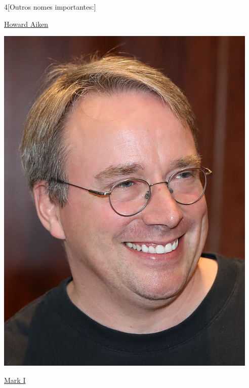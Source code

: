 \begin{multicols}{4}[Outros nomes importantes:]
\vfill\null
\columnbreak				
				
				\href{https://pt.wikipedia.org/wiki/Howard_Aiken}{Howard Aiken}
				
\begin{center}
					\includegraphics[width=.8\columnwidth]{./IMG-GIT/CIENTISTAS/linus.jpeg}
\end{center}
				
\vfill\null
\columnbreak				
				
				\href{https://pt.wikipedia.org/wiki/Mark_I}{Mark I}
				

\end{multicols}
